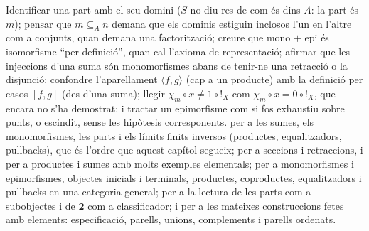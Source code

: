 \begin{resumcap}
\begin{enumerate}
\end{enumerate}
 Identificar una part amb el seu domini (\(S\) no diu res de com és dins \(A\): la part és \(m\)); pensar que \(m\subseteq_A n\) demana que els dominis estiguin inclosos l'un en l'altre com a conjunts, quan demana una factorització; creure que mono $+$ epi és isomorfisme \enquote{per definició}, quan cal l'axioma de representació; afirmar que les injeccions d'una suma són monomorfismes abans de tenir-ne una retracció o la disjunció; confondre l'aparellament \(\langle f,g\rangle\) (cap a un producte) amb la definició per casos \([f,g]\) (des d'una suma); llegir \(\chi_m\circ x\ne1\circ{!}_X\) com \(\chi_m\circ x=0\circ{!}_X\), que encara no s'ha demostrat; i tractar un epimorfisme com si fos exhaustiu sobre punts, o escindit, sense les hipòtesis corresponents.
 \cite[cap.~2 i~3]{lawvere-rosebrugh} per a les sumes, els monomorfismes, les parts i els límits finits inversos (productes, equalitzadors, pullbacks), que és l'ordre que aquest capítol segueix; \cite[article~II, sessions~6--10, i article~IV, sessions~19--25]{lawvere-schanuel} per a seccions i retraccions, i per a productes i sumes amb molts exemples elementals; \cite[§2.1, §§2.2--2.3, §3.1--3.3 i §5.1]{awodey} per a monomorfismes i epimorfismes, objectes inicials i terminals, productes, coproductes, equalitzadors i pullbacks en una categoria general; \cite[pàg.~11]{bell2006} per a la lectura de les parts com a subobjectes i de \(\mathbf2\) com a classificador; i \cite[§§2--6]{halmos} per a les mateixes construccions fetes amb elements: especificació, parells, unions, complements i parells ordenats.
\end{resumcap}
